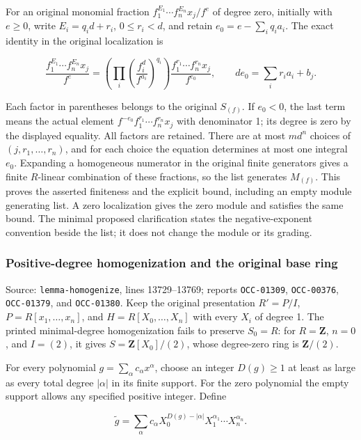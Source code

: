 For an original monomial fraction \(f_1^{E_1}\cdots f_n^{E_n}x_j/f^e\) of degree zero, initially with \(e\geq0\), write \(E_i=q_i d+r_i\), \(0\leq r_i<d\), and retain \(e_0=e-\sum_i q_i a_i\). The exact identity in the original localization is

\[
\frac{f_1^{E_1}\cdots f_n^{E_n}x_j}{f^e}
=\left(\prod_i\left(\frac{f_i^d}{f^{a_i}}\right)^{q_i}\right)
\frac{f_1^{r_1}\cdots f_n^{r_n}x_j}{f^{e_0}},
\qquad de_0=\sum_i r_i a_i+b_j.
\]

Each factor in parentheses belongs to the original \(S_{(f)}\). If \(e_0<0\), the last term means the actual element \(f^{-e_0}f_1^{r_1}\cdots f_n^{r_n}x_j\) with denominator 1; its degree is zero by the displayed equality. All factors are retained. There are at most \(m d^n\) choices of \((j,r_1,\ldots,r_n)\), and for each choice the equation determines at most one integral \(e_0\). Expanding a homogeneous numerator in the original finite generators gives a finite \(R\)-linear combination of these fractions, so the list generates \(M_{(f)}\). This proves the asserted finiteness and the explicit bound, including an empty module generating list. A zero localization gives the zero module and satisfies the same bound. The minimal proposed clarification states the negative-exponent convention beside the list; it does not change the module or its grading.

\subsubsection{Positive-degree homogenization and the original base ring}\label{algebra-proof-002-positive-degree-homogenization-and-the-original-base-ring}

Source: \texttt{lemma-homogenize}, lines 13729--13769; reports \texttt{OCC-01309}, \texttt{OCC-00376}, \texttt{OCC-01379}, and \texttt{OCC-01380}. Keep the original presentation \(R'=P/I\), \(P=R[x_1,\ldots,x_n]\), and \(H=R[X_0,\ldots,X_n]\) with every \(X_i\) of degree 1. The printed minimal-degree homogenization fails to preserve \(S_0=R\): for \(R=\mathbf Z\), \(n=0\), and \(I=(2)\), it gives \(S=\mathbf Z[X_0]/(2)\), whose degree-zero ring is \(\mathbf Z/(2)\).

For every polynomial \(g=\sum_\alpha c_\alpha x^\alpha\), choose an integer \(D(g)\geq1\) at least as large as every total degree \(|\alpha|\) in its finite support. For the zero polynomial the empty support allows any specified positive integer. Define

\[
\widetilde g=\sum_\alpha c_\alpha
 X_0^{D(g)-|\alpha|}X_1^{\alpha_1}\cdots X_n^{\alpha_n}.
\]

